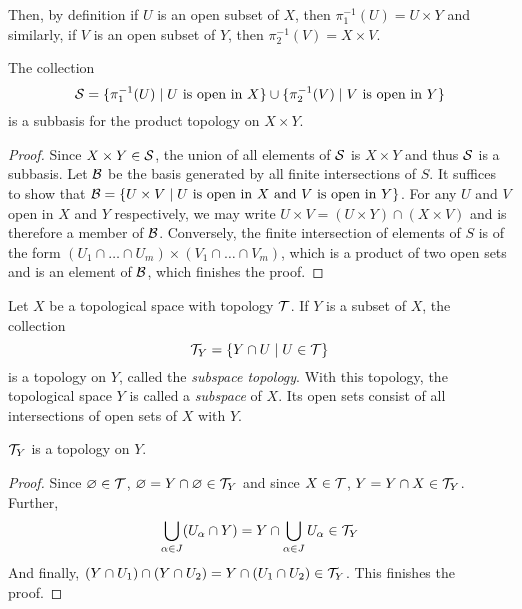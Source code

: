 Then, by definition if $U$ is an open subset of $X$, then $\pi_1^{-1}(U) = U\times Y$ and similarly, if $V$ is an open subset of $Y$, then $\pi_2^{-1}(V) = X\times V$.

\begin{proposition}
    The collection 
    \begin{equation*}
        \S = \{\pi_1^{-1}(U)\mid \text{$U$ is open in $X$}\}\cup\{\pi_2^{-1}(V)\mid\text{$V$ is open in $Y$}\}
    \end{equation*}
    is a subbasis for the product topology on $X\times Y$.
\end{proposition}
\begin{proof}
    Since $X\times Y\in\S$, the union of all elements of $\S$ is $X\times Y$ and thus $\S$ is a subbasis. Let $\B$ be the basis generated by all finite intersections of $S$. It suffices to show that $\B = \{U\times V\mid\text{$U$ is open in $X$ and $V$ is open in $Y$}\}$. For any $U$ and $V$ open in $X$ and $Y$ respectively, we may write $U\times V = (U\times Y)\cap(X\times V)$ and is therefore a member of $\B$. Conversely, the finite intersection of elements of $S$ is of the form $(U_1\cap\ldots\cap U_m)\times(V_1\cap\ldots\cap V_m)$, which is a product of two open sets and is an element of $\B$, which finishes the proof.
\end{proof}

\begin{definition}
    Let $X$ be a topological space with topology $\T$. If $Y$ is a subset of $X$, the collection 
    \begin{equation*}
        \T_Y = \{Y\cap U\mid U\in\T\}
    \end{equation*}
    is a topology on $Y$, called the \textit{subspace topology}. With this topology, the topological space $Y$ is called a \textit{subspace} of $X$. Its open sets consist of all intersections of open sets of $X$ with $Y$.
\end{definition}

\begin{proposition}
    $\T_Y$ is a topology on $Y$.
\end{proposition}
\begin{proof}
    Since $\emptyset\in\T$, $\emptyset = Y\cap\emptyset\in\T_Y$ and since $X\in\T$, $Y = Y\cap X\in\T_Y$. Further, 
    \begin{equation*}
        \bigcup_{\alpha\in J}(U_\alpha\cap Y) = Y\cap\bigcup_{\alpha\in J}U_\alpha\in\T_Y
    \end{equation*}
    And finally, $(Y\cap U_1)\cap(Y\cap U_2) = Y\cap(U_1\cap U_2)\in\T_Y$. This finishes the proof.
\end{proof}

